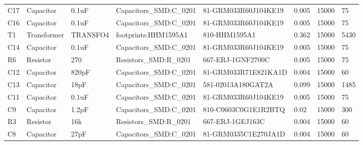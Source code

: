 \begin{landscape}
\begin{table}[]
\begin{tabular}{llllllll}
C17            & Capacitor     & 0.1uF                      & Capacitors\_SMD:C\_0201         & 81-GRM033R60J104KE19                 & 0.005                & 15000           & 75                   \\
C16            & Capacitor     & 0.1uF                      & Capacitors\_SMD:C\_0201         & 81-GRM033R60J104KE19                 & 0.005                & 15000           & 75                   \\
T1             & Transformer   & TRANSFO4                   & footprints:HHM1595A1            & 810-HHM1595A1                        & 0.362                & 15000           & 5430                 \\
C14            & Capacitor     & 0.1uF                      & Capacitors\_SMD:C\_0201         & 81-GRM033R60J104KE19                 & 0.005                & 15000           & 75                   \\
R6             & Resistor      & 270                        & Resistors\_SMD:R\_0201          & 667-ERJ-1GNF2700C                    & 0.005                & 15000           & 75                   \\
C12            & Capacitor     & 820pF                      & Capacitors\_SMD:C\_0201         & 81-GRM033R71E821KA1D                 & 0.004                & 15000           & 60                   \\
C13            & Capacitor     & 18pF                       & Capacitors\_SMD:C\_0201         & 581-02013A180GAT2A                   & 0.099                & 15000           & 1485                 \\
C11            & Capacitor     & 0.1uF                      & Capacitors\_SMD:C\_0201         & 81-GRM033R60J104KE19                 & 0.005                & 15000           & 75                   \\
C9             & Capacitor     & 1.2pF                      & Capacitors\_SMD:C\_0201         & 810-C0603C0G1E1R2BTQ                 & 0.02                 & 15000           & 300                  \\
R3             & Resistor      & 16k                        & Resistors\_SMD:R\_0201          & 667-ERJ-1GEJ163C                     & 0.004                & 15000           & 60                   \\
C8             & Capacitor     & 27pF                       & Capacitors\_SMD:C\_0201         & 81-GRM0335C1E270JA1D                 & 0.004                & 15000           & 60                   \\

\end{tabular}
\end{table}
\end{landscape}
